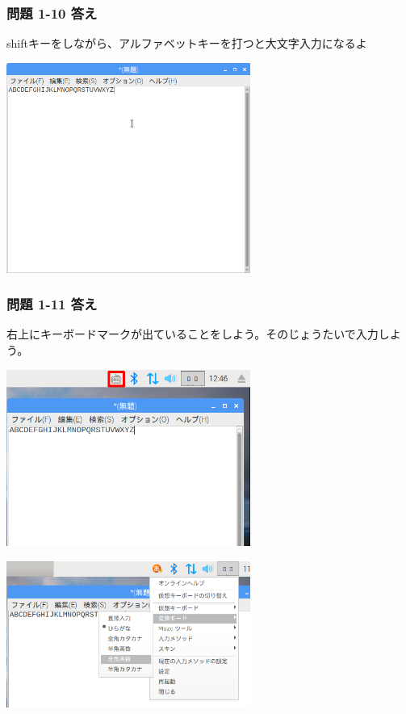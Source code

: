 \clearpage
\subsubsection{\bfseries 問題 1-10 答え}

shiftキーをしながら、アルファベットキーを打つと大文字入力になるよ

\centering
\includegraphics[width=0.6\textwidth]{text01-img/textbook-img217.png}
\flushleft

\clearpage
\subsubsection{\bfseries 問題 1-11 答え}

右上にキーボードマークが出ていることをしよう。そのじょうたいで入力しよう。


\bigskip


\centering
\includegraphics[width=0.6\textwidth]{text01-img/textbook-img218.png}
\flushleft


\bigskip





\centering
\includegraphics[width=0.6\textwidth]{text01-img/textbook-img219.png}
\flushleft


